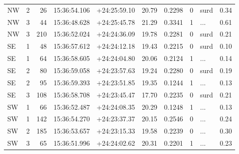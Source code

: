 \begin{tabular}{lrrllrrrlr}
  NW &       2 &     26 &  15:36:54.106 &  +24:25:59.10 &  20.79 &    0.2298 &  0 &       surd &        0.34 \\
  NW &       3 &     44 &  15:36:48.628 &  +24:25:45.78 &  21.29 &    0.3341 &  1 &        ... &        0.61 \\
  NW &       3 &    210 &  15:36:52.024 &  +24:24:36.09 &  19.78 &    0.2281 &  0 &       surd &        0.21 \\
  SE &       1 &     48 &  15:36:57.612 &  +24:24:12.18 &  19.43 &    0.2215 &  0 &       surd &        0.10 \\
  SE &       1 &     64 &  15:36:58.605 &  +24:24:04.80 &  20.06 &    0.2124 &  1 &        ... &        0.14 \\
  SE &       2 &     80 &  15:36:59.058 &  +24:23:57.63 &  19.24 &    0.2280 &  0 &       surd &        0.19 \\
  SE &       2 &     95 &  15:36:59.393 &  +24:23:51.85 &  19.35 &    0.1244 &  1 &        ... &        0.13 \\
  SE &       3 &    108 &  15:36:58.708 &  +24:23:45.47 &  17.70 &    0.2235 &  0 &       surd &        0.21 \\
  SW &       1 &     66 &  15:36:52.487 &  +24:24:08.35 &  20.29 &    0.1248 &  1 &        ... &        0.13 \\
  SW &       1 &    142 &  15:36:54.270 &  +24:23:37.37 &  20.15 &    0.2546 &  0 &        ... &        0.24 \\
  SW &       2 &    185 &  15:36:53.657 &  +24:23:15.33 &  19.58 &    0.2239 &  0 &        ... &        0.30 \\
  SW &       3 &     65 &  15:36:51.996 &  +24:24:02.62 &  20.31 &    0.2201 &  1 &        ... &        0.23 \\
\bottomrule
\end{tabular}
